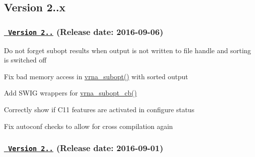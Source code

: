 \subsection*{Version 2..\+x}

\subsubsection*{\href{https://github.com/ViennaRNA/ViennaRNA/compare/v2.2.9...v2.2.10}{\texttt{ Version 2..}} (Release date\+: 2016-\/09-\/06)}


\begin{DoxyItemize}
\item Do not \textquotesingle{}forget\textquotesingle{} subopt results when output is not written to file handle and sorting is switched off
\item Fix bad memory access in \mbox{\hyperlink{group__subopt__wuchty_ga0f11d738fb8c8b1885a90c11c8931ff6}{vrna\+\_\+subopt()}} with sorted output
\item Add S\+W\+IG wrappers for \mbox{\hyperlink{group__subopt__wuchty_ga1053837e6b6f158093508f8a70998352}{vrna\+\_\+subopt\+\_\+cb()}}
\item Correctly show if C11 features are activated in configure status
\item Fix autoconf checks to allow for cross compilation again
\end{DoxyItemize}

\subsubsection*{\href{https://github.com/ViennaRNA/ViennaRNA/compare/v2.2.8...v2.2.9}{\texttt{ Version 2..}} (Release date\+: 2016-\/09-\/01)}


